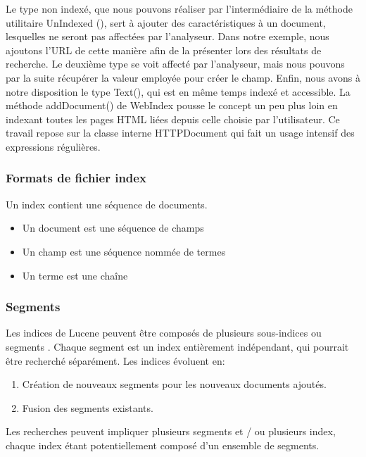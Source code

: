 \documentclass[12pt]{report}
\begin{document}
Le type non indexé, que nous pouvons réaliser par l'intermédiaire de la méthode utilitaire UnIndexed (), sert à ajouter des caractéristiques à un document, lesquelles ne seront pas affectées par l'analyseur. Dans notre exemple, nous ajoutons l'URL de cette manière afin de la présenter lors des résultats de recherche. Le deuxième type se voit affecté par l'analyseur, mais nous pouvons par la suite récupérer la valeur employée pour créer le champ. Enfin, nous avons à notre disposition le type Text(), qui est en même temps indexé et accessible. 
La méthode addDocument() de WebIndex pousse le concept un peu plus loin en indexant toutes les pages HTML liées depuis celle choisie par l'utilisateur. Ce travail repose sur la classe interne HTTPDocument qui fait un usage intensif des expressions régulières.
\subsubsection{Formats de fichier index}
Un index contient une séquence de documents.
\begin{itemize}
\item
Un document est une séquence de champs
\item
Un champ est une séquence nommée de termes
\item
Un terme est une chaîne
\end{itemize}
\subsubsection{Segments}
Les indices de Lucene peuvent être composés de plusieurs sous-indices ou segments . Chaque segment est un index entièrement indépendant, qui pourrait être recherché séparément. Les indices évoluent en:
\begin{enumerate}
\item
Création de nouveaux segments pour les nouveaux documents ajoutés.
\item
Fusion des segments existants.
\end{enumerate}
Les recherches peuvent impliquer plusieurs segments et / ou plusieurs index, chaque index étant potentiellement composé d'un ensemble de segments.
\end{document}
